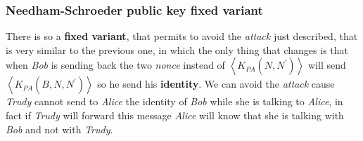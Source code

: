 \documentclass{article}
\begin{document}
\subsubsection{Needham-Schroeder public key fixed variant}
There is so a \textbf{fixed variant}, that permits to avoid the \emph{attack} just described, that is very similar to the previous one, in which the only thing that changes is that when \emph{Bob} is sending back the two \emph{nonce} instead of  $\left \langle K_{PA}(N,N^{'}) \right \rangle$ will send  $\left \langle K_{PA}(B,N,N^{'}) \right \rangle$ so he send his \textbf{identity}. We can avoid the \emph{attack} cause \emph{Trudy} cannot send to \emph{Alice} the identity of \emph{Bob} while she is talking to \emph{Alice}, in fact if \emph{Trudy} will forward this message \emph{Alice} will know that she is talking with \emph{Bob} and not with \emph{Trudy}. 
\clearpage
\end{document}
